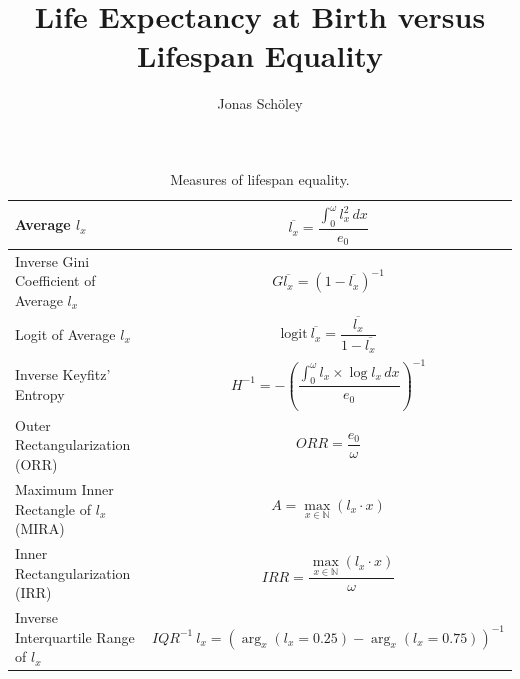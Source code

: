 \documentclass[
  10pt
]{scrartcl}
\title{Life Expectancy at Birth versus Lifespan Equality}
\author{Jonas Schöley}
\begin{document}
\maketitle



\begin{table}[ht!]
\tabformat
  \begin{tabular}{m{}m{}}
  \toprule
  Average $l_x$ & $$\overline{l_x} = \frac{\int_0^\omega l_x^2 \,dx} {e_0}$$ \\
  \midrule
  Inverse Gini Coefficient of Average $l_x$ & $$G\overline{l_x} = \left(1 - \overline{l_x}\right)^{-1}$$ \\
  \midrule
  Logit of Average $l_x$ & $$\text{logit}~\overline{l_x} = \frac{\overline{l_x}} {1 - \overline{l_x}}$$ \\
  \midrule
  Inverse Keyfitz' Entropy & $$H^{-1} = -\left(\frac{\int_0^\omega l_x \times \log l_x\,dx} {e_0}\right)^{-1}$$ \\
  \midrule
  Outer Rectangularization (ORR) & $$ORR = \frac{e_0} {\omega}$$\\
  \midrule
  Maximum Inner Rectangle of $l_x$ (MIRA) & $$A = \max_{x \in \mathbb{N}}(l_x \cdot x)$$ \\
  \midrule
  Inner Rectangularization (IRR) & $$IRR = \frac{\max_{x \in \mathbb{N}}(l_x \cdot x)} {\omega}$$ \\
  \midrule
  Inverse Interquartile Range of $l_x$ & $$IQR^{-1}~l_x = \left(\arg_x (l_x = 0.25) - \arg_x (l_x = 0.75)\right)^{-1}$$ \\
  \bottomrule
  \end{tabular}
  \caption{Measures of lifespan equality.}
\end{table}
\end{document}
